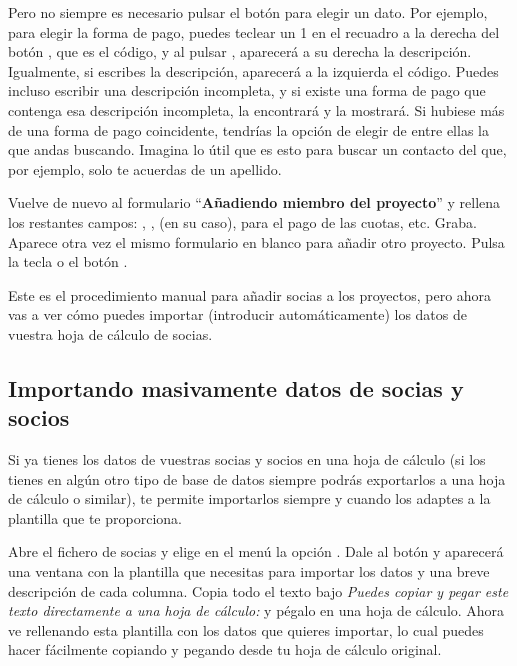 Pero no siempre es necesario pulsar el botón para elegir un dato. Por
ejemplo, para elegir la forma de pago, puedes teclear un 1 en el
recuadro a la derecha del botón ,
que es el código, y al pulsar ,
aparecerá a su derecha la descripción. Igualmente, si escribes la
descripción, aparecerá a la izquierda el código. Puedes incluso
escribir una descripción incompleta, y si existe una forma de pago
que contenga esa descripción incompleta, \appname la encontrará y
la mostrará. Si hubiese más de una forma de pago coincidente,
tendrías la opción de elegir de entre ellas la que andas buscando.
Imagina lo útil que es esto para buscar un contacto del que, por
ejemplo, solo te acuerdas de un apellido.

Vuelve de nuevo al formulario {\textquotedblleft}\textbf{Añadiendo
miembro del proyecto}{\textquotedblright} y rellena los restantes
campos: ,
, 
 (en su caso),
para el pago de las cuotas, etc.
Graba. Aparece otra vez el mismo formulario en blanco para añadir
otro proyecto. Pulsa la tecla  o el botón
.

Este es el procedimiento manual para añadir socias a los proyectos,
pero ahora vas a ver cómo puedes importar (introducir
automáticamente) los datos de vuestra hoja de cálculo de socias.

\subsection{Importando masivamente datos de socias y socios}
\label{ref:Importandomasivamente}Si ya tienes los datos de vuestras
socias y socios en una hoja de cálculo (si los tienes en algún otro
tipo de base de datos siempre podrás exportarlos a una hoja de
cálculo o similar), \appname te permite importarlos siempre y cuando
los adaptes a la plantilla que \appname te proporciona.

Abre el fichero de socias y elige en el menú la opción 
. Dale al botón 
 y aparecerá una ventana con 
la plantilla que necesitas para importar los datos y una breve descripción de cada
columna. Copia todo el texto bajo
\textit{Puedes copiar y pegar este texto directamente a una hoja de cálculo:} y pégalo
en una hoja de cálculo. Ahora ve rellenando esta plantilla con los datos que quieres 
importar, lo cual puedes hacer fácilmente copiando y pegando desde tu hoja de cálculo
original.

